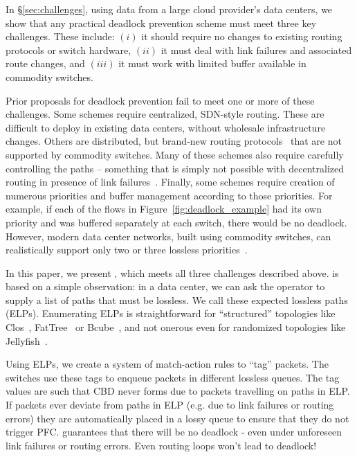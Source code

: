 In \S\ref{sec:challenges}, using data from a large cloud provider's data
centers, we show that any practical deadlock prevention scheme must meet three
key challenges. These include: $(i)$ it should require no changes to existing
routing protocols or switch hardware, $(ii)$ it must deal with link failures and
associated  route changes, and $(iii)$ it must work with limited buffer
available in commodity switches.

Prior proposals for deadlock prevention fail to meet one or more of these
challenges.  Some schemes require centralized, SDN-style routing.  These are
difficult to deploy in existing data centers, without wholesale infrastructure
changes.  Others are distributed, but brand-new routing protocols~\cite{tcpbolt}
that are not supported by commodity switches.  Many of these schemes also
require carefully controlling the paths -- something that is simply not possible
with decentralized routing in presence of link failures~\cite{netpilot}.
Finally, some schemes require creation of numerous priorities and buffer
management according to those priorities. For example, if each of the flows in
Figure~\ref{fig:deadlock_example} had its own priority and was buffered
separately at each switch, there would be no deadlock.  However, modern data
center networks, built using commodity switches, can realistically support only
two or three lossless priorities~\cite{rdmaatscale}. 

In this paper, we present \sysname{}, which meets all three challenges described
above. \sysname{} is based on a simple observation: in a data center, we can ask
the operator to supply a list of paths that must be lossless.
We call these expected lossless paths (ELPs). Enumerating ELPs is
straightforward for ``structured'' topologies like Clos~\cite{clos},
FatTree~\cite{fattree} or Bcube~\cite{bcube}, and not onerous even for
randomized topologies like Jellyfish~\cite{jellyfish}. 

Using ELPs, we create a system of match-action rules to ``tag'' packets. The
switches use these tags to enqueue packets in different lossless queues. The tag
values are such that CBD never forms due to packets travelling on paths in ELP.
If packets ever deviate from paths in ELP (e.g. due to link failures or routing
errors) they are automatically placed in a lossy queue to ensure that they do
not trigger PFC. \sysname{} guarantees that there will be no deadlock - even under
unforeseen link failures or routing errors. Even routing loops won't lead to
deadlock!

